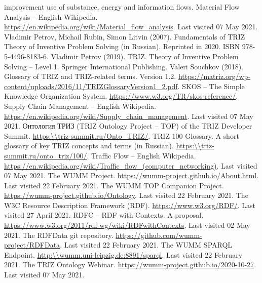 \documentclass[a4paper,11pt]{article}
\newcommand{\ru}[1]{\foreignlanguage{russian}{#1}}
\begin{document}
\begin{thebibliography}{...}
  improvement use of substance, energy and information flows.
 Material Flow Analysis -- English Wikipedia.
  \url{https://en.wikipedia.org/wiki/Material_flow_analysis}.  Last visited 07
  May 2021.
 Vladimir Petrov, Michail Rubin, Simon Litvin (2007).
  Fundamentals of TRIZ Theory of Inventive Problem Solving (in Russian).
  Reprinted in 2020. ISBN 978-5-4496-8183-6.
 Vladimir Petrov (2019). TRIZ. Theory of Inventive Problem
  Solving -- Level 1. Springer International Publishing. 
 Valeri Souchkov (2018).  Glossary of TRIZ and
  TRIZ-related terms. Version 1.2.
  \url{https://matriz.org/wp-content/uploads/2016/11/TRIZGlossaryVersion1_2.pdf}.
 SKOS -- The Simple Knowledge Organization System.
  \url{https://www.w3.org/TR/skos-reference/}.
 Supply Chain Management -- English Wikipedia.
  \url{https://en.wikipedia.org/wiki/Supply_chain_management}.  Last visited
  07 May 2021.
 \ru{Онтология ТРИЗ} (TRIZ Ontology Project -- TOP) of the TRIZ
  Developer Summit.  \url{https:\\triz-summit.ru/Onto_TRIZ/}.
 TRIZ 100 Glossary. A short glossary of key TRIZ
  concepts and terms (in Russian).
  \url{https:\\triz-summit.ru/onto_triz/100/}.
 Traffic Flow -- English Wikipedia.
  \url{https://en.wikipedia.org/wiki/Traffic_flow_(computer_networking)}. Last
  visited 07 May 2021.
 The WUMM Project.
  \url{https://wumm-project.github.io/About.html}. Last visited 22 February
  2021.
 The WUMM TOP Companion Project.
  \url{https://wumm-project.github.io/Ontology}. Last visited 22 February
  2021.
 The W3C Resource Description Framework (RDF).
  \url{https://www.w3.org/RDF/}. Last visited 27 April 2021.
 RDFC -- RDF with Contexts. A proposal.
  \url{https://www.w3.org/2011/rdf-wg/wiki/RDFwithContexts}. Last visited 02
  May 2021.
 The RDFData git repository.
  \url{https://github.com/wumm-project/RDFData}.  Last visited 22 February
  2021.
 The WUMM SPARQL Endpoint.
  \url{http:\\wumm.uni-leipzig.de:8891/sparql}. Last visited 22 February 2021.
 The TRIZ Ontology Webinar.
  \url{https://wumm-project.github.io/2020-10-27}. Last visited 07 May 2021.
\end{thebibliography}
\end{document}
